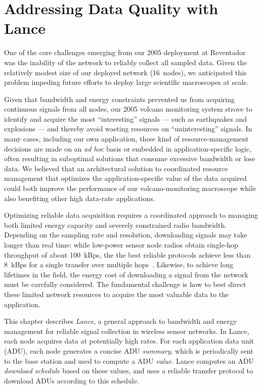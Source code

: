 \chapter{Addressing Data Quality with Lance}
\label{chapter-lance}

One of the core challenges emerging from our 2005 deployment at Reventador
was the inability of the network to reliably collect all sampled data. Given
the relatively modest size of our deployed network (16~nodes), we anticipated
this problem impeding future efforts to deploy large scientific macroscopes
at scale.

Given that bandwidth and energy constraints prevented us from acquiring
continuous signals from all nodes, our 2005 volcano monitoring system strove
to identify and acquire the most ``interesting'' signals --- such as
earthquakes and explosions --- and thereby avoid wasting resources on
``uninteresting'' signals. In many cases, including our own application,
these kind of resource-management decisions are made on an \textit{ad hoc}
basis or embedded in application-specific logic, often resulting in
suboptimal solutions that consume excessive bandwidth or lose data. We
believed that an architectural solution to coordinated resource management
that optimizes the application-specific value of the data acquired could both
improve the performance of our volcano-monitoring macroscope while also
benefiting other high data-rate applications.

Optimizing reliable data acquisition requires a coordinated approach to
managing both limited energy capacity and severely constrained radio
bandwidth. Depending on the sampling rate and resolution, downloading signals
may take longer than real time: while low-power sensor node radios obtain
single-hop throughput of about 100~kBps, the the best reliable protocols
achieve less than 8~kBps for a single transfer over multiple
hops~\cite{flush-sensys07}. Likewise, to achieve long lifetimes in the field,
the energy cost of downloading a signal from the network must be carefully
considered. The fundamental challenge is how to best direct these limited
network resources to acquire the most valuable data to the application.

This chapter describes \textit{Lance}, a general approach to bandwidth and
energy management for reliable signal collection in wireless sensor networks.
In Lance, each node acquires data at potentially high rates. For each
application data unit (ADU), each node generates a concise ADU
\textit{summary}, which is periodically sent to the base station and used to
compute a ADU \textit{value}. Lance computes an ADU \textit{download
schedule} based on these values, and uses a reliable transfer protocol to
download ADUs according to this schedule.

